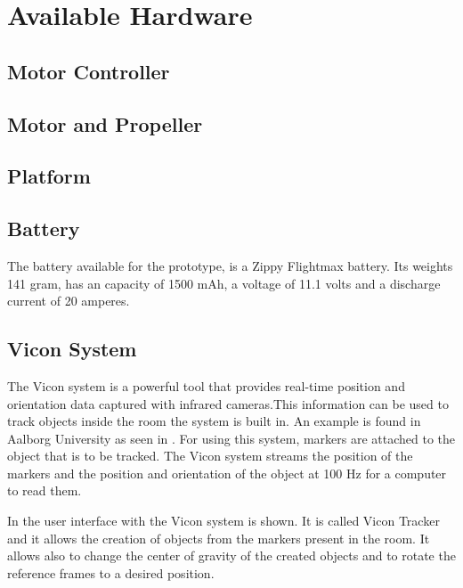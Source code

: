 \section{Available Hardware}

\subsection{Motor Controller}



\subsection{Motor and Propeller}

\subsection{Platform}

\subsection{Battery}

The battery available for the prototype, is a Zippy Flightmax battery. Its weights 141 gram, has an capacity of 1500 mAh, a voltage of 11.1 volts and a discharge current of 20 amperes. 


\subsection{Vicon System}

The Vicon system is a powerful tool that provides real-time position and orientation data captured with infrared cameras.This information can be used to track objects inside the room the system is built in. An example is found in Aalborg University as seen in . 
For using this system, markers are attached to the object that is to be tracked. The Vicon system streams the position of the markers and the position and orientation of the object at 100 Hz for a computer to read them.

In  the user interface with the Vicon system is shown. It is called Vicon Tracker and it allows the creation of objects from the markers present in the room. It allows also to change the center of gravity of the created objects and to rotate the reference frames to a desired position.
